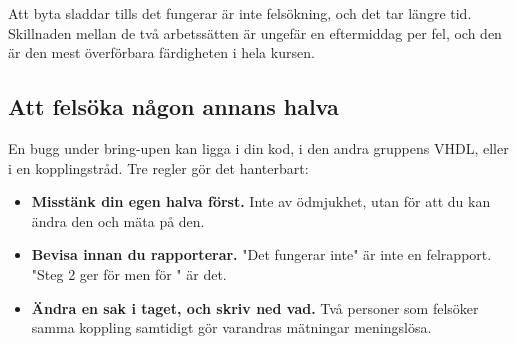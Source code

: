 \begin{aside}
\note Att byta sladdar tills det fungerar är inte felsökning, och det tar längre tid. Skillnaden
mellan de två arbetssätten är ungefär en eftermiddag per fel, och den är den mest överförbara
färdigheten i hela kursen.
\end{aside}

\subsection{Att felsöka någon annans halva}

En bugg under bring-upen kan ligga i din kod, i den andra gruppens VHDL, eller i en kopplingstråd.
Tre regler gör det hanterbart:

\begin{itemize}
  \item \textbf{Misstänk din egen halva först.} Inte av ödmjukhet, utan för att du kan ändra den
    och mäta på den.
  \item \textbf{Bevisa innan du rapporterar.} "Det fungerar inte" är inte en felrapport.
    "Steg 2 ger  för  men  för " är det.
  \item \textbf{Ändra en sak i taget, och skriv ned vad.} Två personer som felsöker samma
    koppling samtidigt gör varandras mätningar meningslösa.
\end{itemize}

